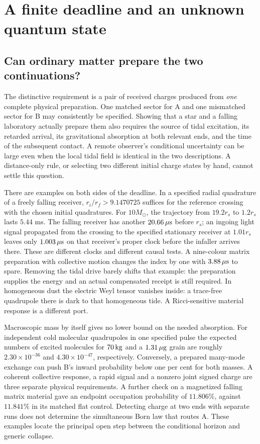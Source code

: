 \documentclass[11pt,a4paper]{article}
\begin{document}


\section{A finite deadline and an unknown quantum state}\label{sec:hole}
\subsection{Can ordinary matter prepare the two continuations?}
The distinctive requirement is a pair of received charges produced from \emph{one} complete physical preparation. One matched sector for A and one mismatched sector for B may consistently be specified. Showing that a star and a falling laboratory actually prepare them also requires the source of tidal excitation, its retarded arrival, its gravitational absorption at both relevant ends, and the time of the subsequent contact. A remote observer's conditional uncertainty can be large even when the local tidal field is identical in the two descriptions. A distance-only rule, or selecting two different initial charge states by hand, cannot settle this question.

There are examples on both sides of the deadline. In a specified radial quadrature of a freely falling receiver, \(r_i/r_f>9.1470725\) suffices for the reference crossing with the chosen initial quadratures. For \(10M_\odot\), the trajectory from \(19.2r_s\) to \(1.2r_s\) lasts \(5.44\) ms. The falling receiver has another \(20.66\,\mu{\rm s}\) before \(r_s\); an ingoing light signal propagated from the crossing to the specified stationary receiver at \(1.01r_s\) leaves only \(1.003\,\mu{\rm s}\) on that receiver's proper clock before the infaller arrives there. These are different clocks and different causal tests. A nine-colour matrix preparation with collective motion changes the index by one with \(3.88\,\mu{\rm s}\) to spare. Removing the tidal drive barely shifts that example: the preparation supplies the energy and an actual compensated receipt is still required. In homogeneous dust the electric Weyl tensor vanishes inside: a trace-free quadrupole there is dark to that homogeneous tide. A Ricci-sensitive material response is a different port.

Macroscopic mass by itself gives no lower bound on the needed absorption. For independent cold molecular quadrupoles in one specified pulse the expected numbers of excited molecules for \(70\,{\rm kg}\) and a \(1.31\,\mu{\rm g}\) grain are roughly \(2.30\times10^{-36}\) and \(4.30\times10^{-47}\), respectively. Conversely, a prepared many-mode exchange can push B's inward probability below one per cent for both masses. A coherent collective response, a rapid signal and a nonzero joint signed charge are three separate physical requirements. A further check on a magnetized falling matrix material gave an endpoint occupation probability of \(11.806\%\), against \(11.841\%\) in its matched flat control. Detecting charge at two ends with separate runs does not determine the simultaneous Born law that routes A. These examples locate the principal open step between the conditional horizon and generic collapse.
\end{document}
